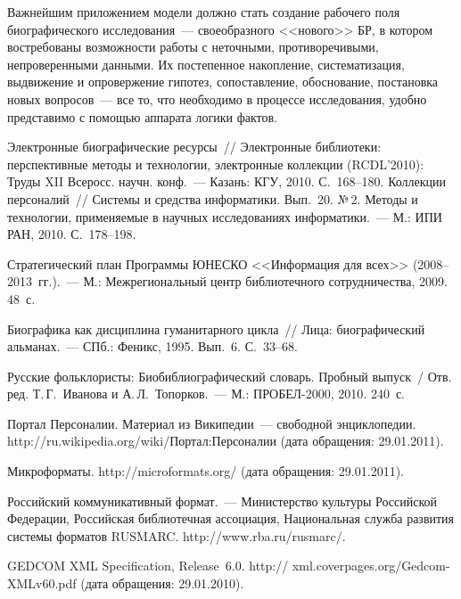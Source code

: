 \begin{multicols}{2}
  Важнейшим приложением модели должно стать создание рабочего поля 
биографического исследования~--- своеобразного <<нового>> БР, в котором 
востребованы возможности работы с неточными, противоречи\-вы\-ми, 
непроверенными данными. Их постепенное накопление, систематизация, 
выдвижение и опровержение гипотез, сопоставление, обосно\-ва\-ние, постановка 
новых вопросов~--- все то, что необходимо в процессе исследования, удобно 
представимо с помощью аппарата логики фактов.

{\small\frenchspacing
{%
\begin{thebibliography}{99}

Электронные биографические ресурсы~// Электронные библиотеки: перспективные методы 
и технологии, электронные коллекции (RCDL'2010): Труды XII Всеросс. научн. конф.~--- 
Казань: КГУ, 2010. С.~168--180.
Коллекции персоналий~// Системы и средства информатики. Вып.~20. №\,2. Методы и 
технологии, применяемые в научных исследованиях информатики.~--- М.: ИПИ РАН, 2010. 
С.~178--198.

Стратегический план Программы ЮНЕСКО <<Информация для всех>> (2008--2013~гг.).~--- 
М.: Межрегиональный центр библиотечного сотрудничества, 2009. 48~с.

Биографика как дисциплина гуманитарного цикла~// Лица: биографический альманах.~--- 
СПб.: Феникс, 1995. Вып.~6. С.~33--68.

Русские фольклористы: Биобиблиографический словарь. Пробный выпуск~/ Отв. ред. 
Т.\,Г.~Иванова и А.\,Л.~Топорков.~--- М.: ПРОБЕЛ-2000, 2010. 240~с. 

Портал Персоналии. Материал из Википедии~--- свободной энциклопедии. {\sf 
http://ru.wikipedia.org/\linebreak wiki/Портал:Персоналии} (дата обращения: 29.01.2011).

Микроформаты. {\sf http://microformats.org/} (дата обращения: 29.01.2011).

Российский коммуникативный формат.~--- Министерство культуры Российской Федерации, 
Российская библиотечная ассоциация, Национальная служба развития системы форматов 
RUSMARC. {\sf http://www.rba.ru/rusmarc/}.

GEDCOM XML Specification, Release~6.0. 
{\sf http:// xml.coverpages.org/Gedcom-XMLv60.pdf} (дата обращения: 29.01.2010).


\end{thebibliography}}}
\end{multicols}
